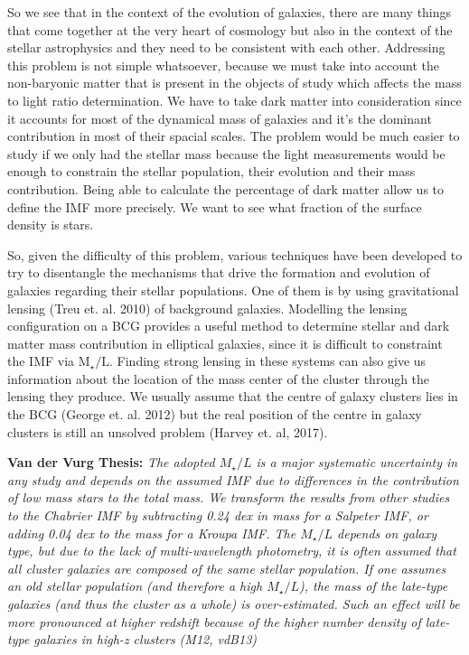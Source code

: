 So we see that in the context of the evolution of galaxies, there are many things that come together at the very heart of cosmology but also in the context of the stellar astrophysics and they need to be consistent with each other. Addressing this problem is not simple whatsoever, because we must take into account the non-baryonic matter that is present in the objects of study which affects the mass to light ratio determination. We have to take dark matter into consideration since it accounts for most of the dynamical mass of galaxies and it's the dominant contribution in most of their spacial scales. The problem would be much easier to study if we only had the stellar mass because the light measurements would be enough to constrain the stellar population, their evolution and their mass contribution. Being able to calculate the percentage of dark matter allow us to define the IMF more precisely. We want to see what fraction of the surface density is stars.

So, given the difficulty of this problem, various techniques have been developed to try to disentangle the mechanisms that drive the formation and evolution of galaxies regarding their stellar populations. One of them is by using gravitational lensing (Treu et. al. 2010) of background galaxies. Modelling the lensing configuration on a BCG provides a useful method to determine stellar and dark matter mass contribution in elliptical galaxies, since it is difficult to constraint the IMF via $\textrm{M}_{\star}/\text{L}$. Finding strong lensing in these systems can also give us information about the location of the mass center of the cluster through the lensing they produce. We usually assume that the centre of galaxy clusters lies in the BCG (George et. al. 2012) but the real position of the centre in galaxy clusters is still an unsolved problem (Harvey et. al, 2017). 

\textbf{Van der Vurg Thesis:} \textit{The adopted $M_{\star}/L$ is a major systematic uncertainty in any study and depends on the assumed IMF due to differences in the contribution of low mass stars to the total mass. We transform the results from other studies to the Chabrier IMF by subtracting 0.24 dex in mass for a Salpeter IMF, or adding 0.04 dex to the mass for a Kroupa IMF. The $M_{\star}/L$ depends on galaxy type, but due to the lack of multi-wavelength photometry, it is often assumed that all cluster galaxies are composed of the same stellar population. If one assumes an old stellar population (and therefore a high $M_{\star}/L$), the mass of the late-type galaxies (and thus the cluster as a whole) is over-estimated. Such an effect will be more pronounced at higher redshift because of the higher number density of late-type galaxies in high-z clusters (M12, vdB13)}

